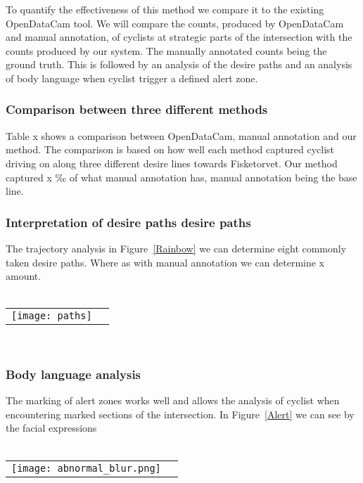 To quantify the effectiveness of this method we compare it to the existing OpenDataCam tool.
We will compare the counts, produced by OpenDataCam and manual annotation, of cyclists at strategic parts of the intersection with the counts produced by our system. The manually annotated counts being the ground truth.
This is followed by an analysis of the desire paths and an analysis of body language when cyclist trigger a defined
alert zone.
\ \\ 

\subsubsection{Comparison between three different methods}
Table x shows a comparison between OpenDataCam, manual annotation and our method.
The comparison is based on how well each method captured cyclist driving on along three different 
desire lines towards Fisketorvet.
Our method captured x ‰ of what manual annotation has, manual annotation being the base line.
\ \\

\subsubsection{Interpretation of desire paths desire paths}
The trajectory analysis in Figure~\ref{Rainbow} we can determine eight commonly taken desire paths. 
Where as with manual annotation we can determine x amount.
\ \\
\raggedbottom
\ \\ 
\noindent
\begin{tabular}{@{}cc}
\texttt{[image: paths]} 
\end{tabular}
\label{traject}

\ \\
\subsubsection{Body language analysis}
The marking of alert zones works well and allows the analysis of cyclist when encountering marked sections of the 
intersection. In Figure~\ref{Alert} we can see by the facial expressions 
\ \\
\raggedbottom
\ \\ 
\noindent
\begin{tabular}{@{}cc}
\texttt{[image: abnormal\_blur.png]} 
\end{tabular}
\label{Alert}
\ \\


